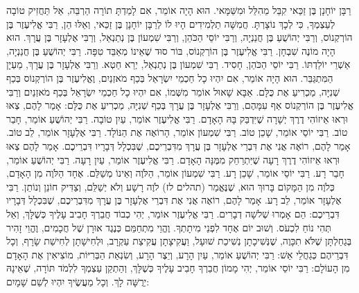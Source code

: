 רַבָּן יוֹחָנָן בֶּן זַכַּאי קִבֵּל מֵהִלֵּל וּמִשַּׁמָּאי. הוּא הָיָה אוֹמֵר, אִם לָמַדְתָּ תוֹרָה הַרְבֵּה, אַל תַּחֲזִיק טוֹבָה לְעַצְמְךָ, כִּי לְכָךְ נוֹצָרְתָּ. חֲמִשָּׁה תַלְמִידִים הָיוּ לוֹ לְרַבָּן יוֹחָנָן בֶּן זַכַּאי, וְאֵלּוּ הֵן, רַבִּי אֱלִיעֶזֶר בֶּן הוֹרְקְנוֹס, וְרַבִּי יְהוֹשֻׁעַ בֶּן חֲנַנְיָה, וְרַבִּי יוֹסֵי הַכֹּהֵן, וְרַבִּי שִׁמְעוֹן בֶּן נְתַנְאֵל, וְרַבִּי אֶלְעָזָר בֶּן עֲרָךְ. הוּא הָיָה מוֹנֶה שִׁבְחָן. רַבִּי אֱלִיעֶזֶר בֶּן הוֹרְקְנוֹס, בּוֹר סוּד שֶׁאֵינוֹ מְאַבֵּד טִפָּה. רַבִּי יְהוֹשֻׁעַ בֶּן חֲנַנְיָה, אַשְׁרֵי יוֹלַדְתּוֹ. רַבִּי יוֹסֵי הַכֹּהֵן, חָסִיד. רַבִּי שִׁמְעוֹן בֶּן נְתַנְאֵל, יְרֵא חֵטְא. וְרַבִּי אֶלְעָזָר בֶּן עֲרָךְ, מַעְיָן הַמִּתְגַּבֵּר. הוּא הָיָה אוֹמֵר, אִם יִהְיוּ כָל חַכְמֵי יִשְׂרָאֵל בְּכַף מֹאזְנַיִם, וֶאֱלִיעֶזֶר בֶּן הוֹרְקְנוֹס בְּכַף שְׁנִיָּה, מַכְרִיעַ אֶת כֻּלָּם. אַבָּא שָׁאוּל אוֹמֵר מִשְּׁמוֹ, אִם יִהְיוּ כָל חַכְמֵי יִשְׂרָאֵל בְּכַף מֹאזְנַיִם וְרַבִּי אֱלִיעֶזֶר בֶּן הוֹרְקְנוֹס אַף עִמָּהֶם, וְרַבִּי אֶלְעָזָר בֶּן עֲרָךְ בְּכַף שְׁנִיָּה, מַכְרִיעַ אֶת כֻּלָּם:
אָמַר לָהֶם, צְאוּ וּרְאוּ אֵיזוֹהִי דֶרֶךְ יְשָׁרָה שֶׁיִּדְבַּק בָּהּ הָאָדָם. רַבִּי אֱלִיעֶזֶר אוֹמֵר, עַיִן טוֹבָה. רַבִּי יְהוֹשֻׁעַ אוֹמֵר, חָבֵר טוֹב. רַבִּי יוֹסֵי אוֹמֵר, שָׁכֵן טוֹב. רַבִּי שִׁמְעוֹן אוֹמֵר, הָרוֹאֶה אֶת הַנּוֹלָד. רַבִּי אֶלְעָזָר אוֹמֵר, לֵב טוֹב. אָמַר לָהֶם, רוֹאֶה אֲנִי אֶת דִּבְרֵי אֶלְעָזָר בֶּן עֲרָךְ מִדִּבְרֵיכֶם, שֶׁבִּכְלָל דְּבָרָיו דִּבְרֵיכֶם. אָמַר לָהֶם צְאוּ וּרְאוּ אֵיזוֹהִי דֶרֶךְ רָעָה שֶׁיִּתְרַחֵק מִמֶּנָּה הָאָדָם. רַבִּי אֱלִיעֶזֶר אוֹמֵר, עַיִן רָעָה. רַבִּי יְהוֹשֻׁעַ אוֹמֵר, חָבֵר רָע. רַבִּי יוֹסֵי אוֹמֵר, שָׁכֵן רָע. רַבִּי שִׁמְעוֹן אוֹמֵר, הַלֹּוֶה וְאֵינוֹ מְשַׁלֵּם. אֶחָד הַלֹּוֶה מִן הָאָדָם, כְּלֹוֶה מִן הַמָּקוֹם בָּרוּךְ הוּא, שֶׁנֶּאֱמַר (תהלים לז) לֹוֶה רָשָׁע וְלֹא יְשַׁלֵּם, וְצַדִּיק חוֹנֵן וְנוֹתֵן. רַבִּי אֶלְעָזָר אוֹמֵר, לֵב רָע. אָמַר לָהֶם, רוֹאֶה אֲנִי אֶת דִּבְרֵי אֶלְעָזָר בֶּן עֲרָךְ מִדִּבְרֵיכֶם, שֶׁבִּכְלָל דְּבָרָיו דִּבְרֵיכֶם:
הֵם אָמְרוּ שְׁלשָׁה דְבָרִים. רַבִּי אֱלִיעֶזֶר אוֹמֵר, יְהִי כְבוֹד חֲבֵרְךָ חָבִיב עָלֶיךָ כְּשֶׁלָּךְ, וְאַל תְּהִי נוֹחַ לִכְעֹס. וְשׁוּב יוֹם אֶחָד לִפְנֵי מִיתָתְךָ. וֶהֱוֵי מִתְחַמֵּם כְּנֶגֶד אוּרָן שֶׁל חֲכָמִים, וֶהֱוֵי זָהִיר בְּגַחַלְתָּן שֶׁלֹּא תִכָּוֶה, שֶׁנְּשִׁיכָתָן נְשִׁיכַת שׁוּעָל, וַעֲקִיצָתָן עֲקִיצַת עַקְרָב, וּלְחִישָׁתָן לְחִישַׁת שָׂרָף, וְכָל דִּבְרֵיהֶם כְּגַחֲלֵי אֵשׁ:
רַבִּי יְהוֹשֻׁעַ אוֹמֵר, עַיִן הָרָע, וְיֵצֶר הָרָע, וְשִׂנְאַת הַבְּרִיּוֹת, מוֹצִיאִין אֶת הָאָדָם מִן הָעוֹלָם:
רַבִּי יוֹסֵי אוֹמֵר, יְהִי מָמוֹן חֲבֵרְךָ חָבִיב עָלֶיךָ כְּשֶׁלָּךְ, וְהַתְקֵן עַצְמְךָ לִלְמֹד תּוֹרָה, שֶׁאֵינָהּ יְרֻשָּׁה לָךְ. וְכָל מַעֲשֶׂיךָ יִהְיוּ לְשֵׁם שָׁמָיִם:
